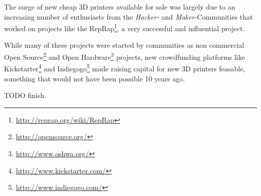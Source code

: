 
The surge of new cheap 3D printers available for sale was largely due to an
increasing number of enthusiasts from the \emph{Hacker-} and
\emph{Maker-}Communities that worked on projects like the
RepRap\footnote{\url{http://reprap.org/wiki/RepRap}}, a very successful and
influential project.

While many of these projects were started by communities as non commercial Open
Source\footnote{\url{http://opensource.org/}} and Open
Hardware\footnote{\url{http://www.oshwa.org/}} projects, new crowdfunding
platforms like Kickstarter\footnote{\url{http://www.kickstarter.com/}} and
Indiegogo\footnote{\url{http://www.indiegogo.com/}} made raising capital for new
3D printers feasable, something that would not have been possible 10 years ago.

TODO finish.
